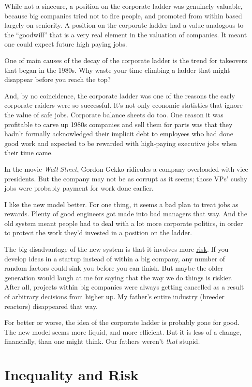 \documentclass[12pt]{book}
\begin{document}
While not a sinecure, a position on the corporate ladder was genuinely
valuable, because big companies tried not to fire people, and promoted
from within based largely on seniority. A position on the corporate
ladder had a value analogous to the ``goodwill'' that is a very real
element in the valuation of companies. It meant one could expect future
high paying jobs.

One of main causes of the decay of the corporate ladder is the trend for
takeovers that began in the 1980s. Why waste your time climbing a ladder
that might disappear before you reach the top?

And, by no coincidence, the corporate ladder was one of the reasons the
early corporate raiders were so successful. It's not only economic
statistics that ignore the value of safe jobs. Corporate balance sheets
do too. One reason it was profitable to carve up 1980s companies and
sell them for parts was that they hadn't formally acknowledged their
implicit debt to employees who had done good work and expected to be
rewarded with high-paying executive jobs when their time came.

In the movie \emph{Wall Street}, Gordon Gekko ridicules a company
overloaded with vice presidents. But the company may not be as corrupt
as it seems; those VPs' cushy jobs were probably payment for work done
earlier.

I like the new model better. For one thing, it seems a bad plan to treat
jobs as rewards. Plenty of good engineers got made into bad managers
that way. And the old system meant people had to deal with a lot more
corporate politics, in order to protect the work they'd invested in a
position on the ladder.

The big disadvantage of the new system is that it involves more
\href{inequality.html}{risk}. If you develop ideas in a startup instead
of within a big company, any number of random factors could sink you
before you can finish. But maybe the older generation would laugh at me
for saying that the way we do things is riskier. After all, projects
within big companies were always getting cancelled as a result of
arbitrary decisions from higher up. My father's entire industry (breeder
reactors) disappeared that way.

For better or worse, the idea of the corporate ladder is probably gone
for good. The new model seems more liquid, and more efficient. But it is
less of a change, financially, than one might think. Our fathers weren't
\emph{that} stupid.
\chapter{Inequality and Risk}
\end{document}
